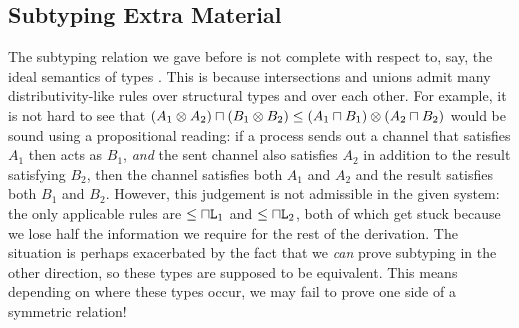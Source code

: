 \documentclass[a4paper,USenglish]{lipics-v2016}
\newcommand\lab{lab}
\begin{document}


\subsection{Subtyping Extra Material}

The subtyping relation we gave before is not complete with respect to, say, the ideal semantics of types \cite{VouillonM04, Damm94}. This is because intersections and unions admit many distributivity-like rules over structural types and over each other. For example, it is not hard to see that $(A_1 \otimes A_2) \mathbin{\sqcap} (B_1 \otimes B_2) \le (A_1 \mathbin{\sqcap} B_1) \otimes (A_2 \mathbin{\sqcap} B_2)$ would be sound using a propositional reading: if a process sends out a channel that satisfies $A_1$ then acts as $B_1$, \emph{and} the sent channel also satisfies $A_2$ in addition to the result satisfying $B_2$, then the channel satisfies both $A_1$ and $A_2$ and the result satisfies both $B_1$ and $B_2$. However, this judgement is not admissible in the given system: the only applicable rules are $\le{\mathbin{\sqcap}\texttt{L}_1}$ and $\le{\mathbin{\sqcap}\texttt{L}_2}$, both of which get stuck because we lose half the information we require for the rest of the derivation. The situation is perhaps exacerbated by the fact that we \emph{can} prove subtyping in the other direction, so these types are supposed to be equivalent. This means depending on where these types occur, we may fail to prove one side of a symmetric relation!
\end{document}

